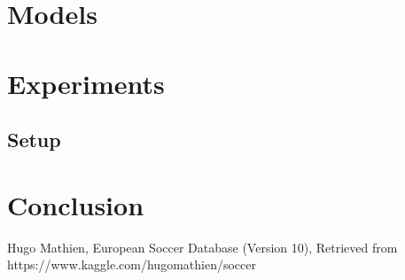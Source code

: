 \documentclass[a4paper]{article}
\begin{document}
\section{Models} \label{models}




\section{Experiments} \label{experiments}
\subsection{Setup}



\section{Conclusion} \label{conclusion}






\begin{thebibliography}{10}
 Hugo Mathien, European Soccer Database (Version 10), Retrieved from https://www.kaggle.com/hugomathien/soccer

\end{thebibliography}
\end{document}
